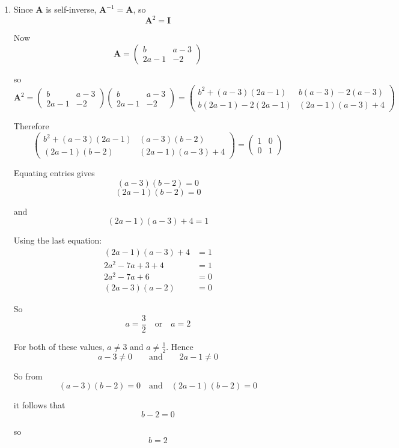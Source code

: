 \documentclass[leqno]{article}
\begin{document}
\begin{enumerate}[
  label=\textbf{\arabic*.},
  leftmargin=*,
  topsep=0pt,
  partopsep=0pt,
  parsep=0pt
]
\begin{djsSolution}
\begin{enumerate}[label=\textbf{(\alph*)}]
  \item Since \(\mathbf{A}\) is self-inverse, \(\mathbf{A}^{-1}=\mathbf{A}\), so
\[
\mathbf{A}^2=\mathbf{I}
\]

Now
\[
\mathbf{A}=\begin{pmatrix} b & a-3 \\ 2a-1 & -2 \end{pmatrix}
\]

so
\[
\mathbf{A}^2=
\begin{pmatrix} b & a-3 \\ 2a-1 & -2 \end{pmatrix}
\begin{pmatrix} b & a-3 \\ 2a-1 & -2 \end{pmatrix}
=
\begin{pmatrix}
b^2+(a-3)(2a-1) & b(a-3)-2(a-3) \\
b(2a-1)-2(2a-1) & (2a-1)(a-3)+4
\end{pmatrix}
\]

Therefore
\[
\begin{pmatrix}
b^2+(a-3)(2a-1) & (a-3)(b-2) \\
(2a-1)(b-2) & (2a-1)(a-3)+4
\end{pmatrix}
=
\begin{pmatrix}
1 & 0 \\
0 & 1
\end{pmatrix}
\]

Equating entries gives
\[
(a-3)(b-2)=0
\]
\[
(2a-1)(b-2)=0
\]

and
\[
(2a-1)(a-3)+4=1
\]

Using the last equation:
\begin{align*}
(2a-1)(a-3)+4&=1\\
2a^2-7a+3+4&=1\\
2a^2-7a+6&=0\\
(2a-3)(a-2)&=0
\end{align*}

So
\[
a=\frac32 \quad \text{or} \quad a=2
\]

For both of these values, \(a\neq 3\) and \(a\neq \frac12\). Hence
\[
a-3\neq 0 \qquad \text{and} \qquad 2a-1\neq 0
\]

So from
\[
(a-3)(b-2)=0 \quad \text{and} \quad (2a-1)(b-2)=0
\]

it follows that
\[
b-2=0
\]

so
\[
b=2
\]


\end{enumerate}
\end{djsSolution}
\end{enumerate}
\end{document}
